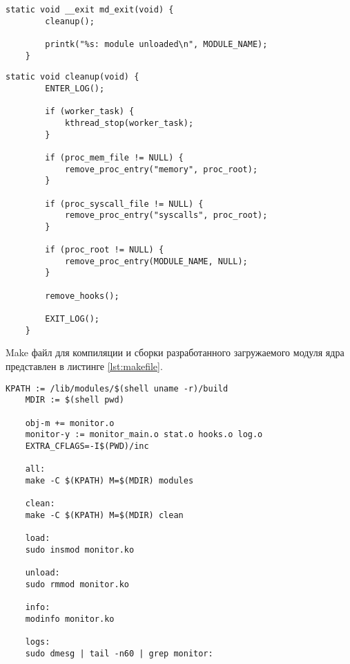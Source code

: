 \begin{lstlisting}[label={lst:mdexit}, caption={функция выхода из модуля}]
	static void __exit md_exit(void) { 
		cleanup();
		
		printk("%s: module unloaded\n", MODULE_NAME); 
	}
\end{lstlisting}

\begin{lstlisting}[label={lst:cleanup}, caption={функция cleanup()}]
	static void cleanup(void) {
		ENTER_LOG();
		
		if (worker_task) {
			kthread_stop(worker_task);
		}
		
		if (proc_mem_file != NULL) {
			remove_proc_entry("memory", proc_root);
		}
		
		if (proc_syscall_file != NULL) {
			remove_proc_entry("syscalls", proc_root);
		}
		
		if (proc_root != NULL) {
			remove_proc_entry(MODULE_NAME, NULL);
		}
		
		remove_hooks();
		
		EXIT_LOG();
	}
\end{lstlisting}

Make файл для компиляции и сборки разработанного загружаемого модуля ядра представлен в листинге \ref{lst:makefile}.

\begin{lstlisting}[label={lst:makefile}, caption={реализация make файла}]
	KPATH := /lib/modules/$(shell uname -r)/build
	MDIR := $(shell pwd)
	
	obj-m += monitor.o
	monitor-y := monitor_main.o stat.o hooks.o log.o
	EXTRA_CFLAGS=-I$(PWD)/inc
	
	all:
	make -C $(KPATH) M=$(MDIR) modules
	
	clean:
	make -C $(KPATH) M=$(MDIR) clean
	
	load:
	sudo insmod monitor.ko
	
	unload:
	sudo rmmod monitor.ko
	
	info:
	modinfo monitor.ko
	
	logs:
	sudo dmesg | tail -n60 | grep monitor:
\end{lstlisting}
